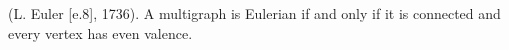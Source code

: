 (L. Euler [e.8], 1736). A multigraph is Eulerian if and only if it is connected and every vertex has even valence.

